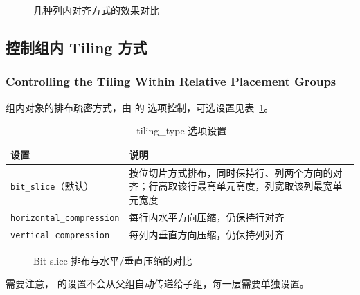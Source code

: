 \begin{figure}[htbp]
\centering
{}
\caption{几种列内对齐方式的效果对比}
\label{fig:rp-align}
\end{figure}

\subsection{控制组内 Tiling 方式}
\subsubsection*{Controlling the Tiling Within Relative Placement Groups}

组内对象的排布疏密方式，由  的  选项控制，可选设置见表~\ref{tab:rp-tiling}。

\begin{table}[htbp]
\centering
\caption{-tiling\_type 选项设置}
\label{tab:rp-tiling}
\begin{tabularx}{\textwidth}{lX}
\toprule
设置 & 说明 \\
\midrule
\texttt{bit\_slice}（默认） & 按位切片方式排布，同时保持行、列两个方向的对齐；行高取该行最高单元高度，列宽取该列最宽单元宽度 \\
\texttt{horizontal\_compression} & 每行内水平方向压缩，仍保持行对齐 \\
\texttt{vertical\_compression} & 每列内垂直方向压缩，仍保持列对齐 \\
\bottomrule
\end{tabularx}
\end{table}

\begin{figure}[htbp]
\centering
{}
\caption{Bit-slice 排布与水平/垂直压缩的对比}
\label{fig:rp-tiling}
\end{figure}

需要注意， 的设置不会从父组自动传递给子组，每一层需要单独设置。

